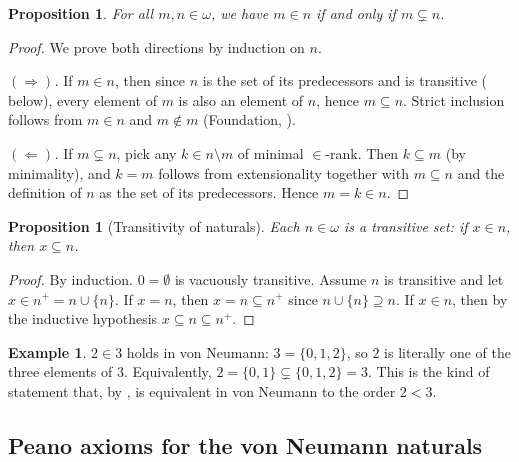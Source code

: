 \documentclass[12pt]{article}
\newtheorem{proposition}[theorem]{Proposition}
\theoremstyle{definition}
\newtheorem{example}[theorem]{Example}
\theoremstyle{remark}
\begin{document}
\begin{proposition}\label{prop:in-equals-subset}
For all $m, n \in \omega$, we have $m \in n$ if and only if $m \subsetneq n$.
\end{proposition}

\begin{proof}
We prove both directions by induction on $n$.

\emph{$(\Rightarrow)$.} If $m \in n$, then since $n$ is the set of its
predecessors and is transitive ( below), every element
of $m$ is also an element of $n$, hence $m \subseteq n$. Strict inclusion
follows from $m \in n$ and $m \notin m$ (Foundation, ).

\emph{$(\Leftarrow)$.} If $m \subsetneq n$, pick any $k \in n \setminus m$
of minimal $\in$-rank. Then $k \subseteq m$ (by minimality), and $k = m$
follows from extensionality together with $m \subseteq n$ and the definition
of $n$ as the set of its predecessors. Hence $m = k \in n$.
\end{proof}

\begin{proposition}[Transitivity of naturals]\label{prop:transitive}
Each $n \in \omega$ is a \emph{transitive set}: if $x \in n$, then $x \subseteq n$.
\end{proposition}

\begin{proof}
By induction. $0 = \emptyset$ is vacuously transitive. Assume $n$ is
transitive and let $x \in n^+ = n \cup \{n\}$. If $x = n$, then $x = n \subseteq n^+$
since $n \cup \{n\} \supseteq n$. If $x \in n$, then by the inductive
hypothesis $x \subseteq n \subseteq n^+$.
\end{proof}

\begin{example}
$2 \in 3$ holds in von Neumann: $3 = \{0,1,2\}$, so $2$ is literally one of the
three elements of $3$. Equivalently, $2 = \{0,1\} \subsetneq \{0,1,2\} = 3$.
This is the kind of statement that, by , is
equivalent in von Neumann to the order $2 < 3$.
\end{example}

\subsection{Peano axioms for the von Neumann naturals}
\end{document}
